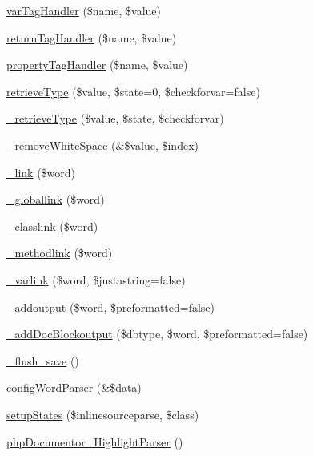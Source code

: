 \begin{DoxyCompactItemize}
\hyperlink{classphp_documentor___highlight_parser_aabc41000dbb16c9e2f3fc4750941906a}{var\-Tag\-Handler} (\$name, \$value)
\item 
\hyperlink{classphp_documentor___highlight_parser_a3f1393a72b540d3f62d3e84480e619d2}{return\-Tag\-Handler} (\$name, \$value)
\item 
\hyperlink{classphp_documentor___highlight_parser_a134c963747a4b65ebd261c6781b80ba5}{property\-Tag\-Handler} (\$name, \$value)
\item 
\hyperlink{classphp_documentor___highlight_parser_ab40a58f29c868700b19550679df95544}{retrieve\-Type} (\$value, \$state=0, \$checkforvar=false)
\item 
\hyperlink{classphp_documentor___highlight_parser_aa588dca5ad3720650c920f06be4804c8}{\-\_\-retrieve\-Type} (\$value, \$state, \$checkforvar)
\item 
\hyperlink{classphp_documentor___highlight_parser_a38ffa698b86adeae050f35cab3c98e7b}{\-\_\-remove\-White\-Space} (\&\$value, \$index)
\item 
\hyperlink{classphp_documentor___highlight_parser_a5b861b5877e7969430612f504417bdf4}{\-\_\-link} (\$word)
\item 
\hyperlink{classphp_documentor___highlight_parser_a543ae0173d8f9778c985fe2f1bee5b03}{\-\_\-globallink} (\$word)
\item 
\hyperlink{classphp_documentor___highlight_parser_a25949e07b59c8d777b94bb6520f66300}{\-\_\-classlink} (\$word)
\item 
\hyperlink{classphp_documentor___highlight_parser_a6c2a487738d31e164ab6c0ddaa1df096}{\-\_\-methodlink} (\$word)
\item 
\hyperlink{classphp_documentor___highlight_parser_abb4286c2e0e866198743632494d5d155}{\-\_\-varlink} (\$word, \$justastring=false)
\item 
\hyperlink{classphp_documentor___highlight_parser_a1acd6d7a8b8e29e7ddfa0f843399d65b}{\-\_\-addoutput} (\$word, \$preformatted=false)
\item 
\hyperlink{classphp_documentor___highlight_parser_ab5f77f783677a6c03a2cd7ae780bf3ac}{\-\_\-add\-Doc\-Blockoutput} (\$dbtype, \$word, \$preformatted=false)
\item 
\hyperlink{classphp_documentor___highlight_parser_afb220b399efe46477cf6da0ae8712b68}{\-\_\-flush\-\_\-save} ()
\item 
\hyperlink{classphp_documentor___highlight_parser_a5b6d9473f683f7db254c4ce70cddaef8}{config\-Word\-Parser} (\&\$data)
\item 
\hyperlink{classphp_documentor___highlight_parser_a08a9491bf69e824ffe31bd76920662b9}{setup\-States} (\$inlinesourceparse, \$class)
\item 
\hyperlink{classphp_documentor___highlight_parser_ab781dbf4f5524e7e7bf97c37f198e33b}{php\-Documentor\-\_\-\-Highlight\-Parser} ()
\end{DoxyCompactItemize}
